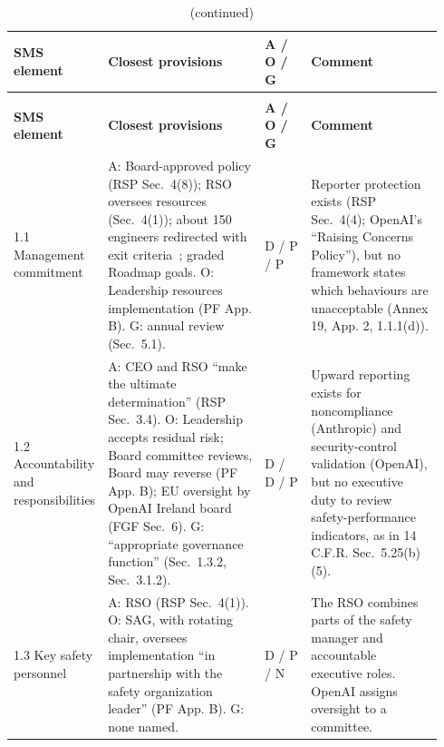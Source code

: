 \documentclass[11pt]{article}
\begin{document}
{\footnotesize
\setlength{\tabcolsep}{4pt}\renewcommand{\arraystretch}{1.0}
\begin{longtable}{@{}>{\raggedright\arraybackslash}p{0.14\linewidth}>{\raggedright\arraybackslash}p{0.375\linewidth}>{\centering\arraybackslash}p{0.115\linewidth}>{\raggedright\arraybackslash}p{0.31\linewidth}@{}}
\caption{ICAO SMS elements mapped onto frontier AI developers' public documents. A = Anthropic (RSP v3.4~\cite{anthropic2026rsp}, Roadmap~\cite{anthropic2026roadmap}, Risk Report~\cite{anthropic2026riskreport} and 2026 posts~\cite{anthropic2026cyberassessment,anthropic2026aisi,anthropic2026threeincidents,anthropic2026unintended,anthropic2026improving}); O = OpenAI (Preparedness Framework v2~\cite{openai2025pf} and FGF~\cite{openaiFGF}); G = Google DeepMind (Frontier Safety Framework v3.1~\cite{gdm2026fsf}). D = described; P = partly described; N = not described in the documents assessed.}\label{tab:mapping}\\
\toprule
\textbf{SMS element} & \textbf{Closest provisions} & \textbf{A / O / G} & \textbf{Comment} \\
\midrule
\endfirsthead
\caption[]{(continued)}\\
\toprule
\textbf{SMS element} & \textbf{Closest provisions} & \textbf{A / O / G} & \textbf{Comment} \\
\midrule
\endhead
\midrule
\endfoot
\bottomrule
\endlastfoot
{}1.1 Management commitment & A: Board-approved policy (RSP Sec.~4(8)); RSO oversees resources (Sec.~4(1)); about 150 engineers redirected with exit criteria~\cite{anthropic2026improving}; graded Roadmap goals. O: Leadership resources implementation (PF App. B). G: annual review (Sec.~5.1). & D / P / P & Reporter protection exists (RSP Sec.~4(4); OpenAI's ``Raising Concerns Policy''), but no framework states which behaviours are unacceptable (Annex 19, App. 2, 1.1.1(d)). \\
\addlinespace[2pt]
{}1.2 Accountability and responsibilities & A: CEO and RSO ``make the ultimate determination'' (RSP Sec.~3.4). O: Leadership accepts residual risk; Board committee reviews, Board may reverse (PF App. B); EU oversight by OpenAI Ireland board (FGF Sec.~6). G: ``appropriate governance function'' (Sec.~1.3.2, Sec.~3.1.2). & D / D / P & Upward reporting exists for noncompliance (Anthropic) and security-control validation (OpenAI), but no executive duty to review safety-performance indicators, as in 14 C.F.R. Sec.~5.25(b)(5). \\
\addlinespace[2pt]
{}1.3 Key safety personnel & A: RSO (RSP Sec.~4(1)). O: SAG, with rotating chair, oversees implementation ``in partnership with the safety organization leader'' (PF App. B). G: none named. & D / P / N & The RSO combines parts of the safety manager and accountable executive roles. OpenAI assigns oversight to a committee. \\

\end{longtable}}
\end{document}
